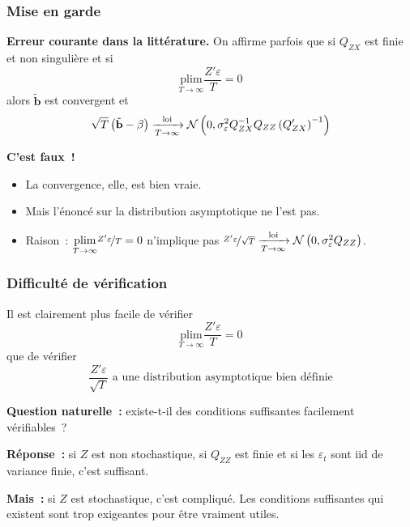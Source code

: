 \documentclass[10pt]{beamer}
\begin{document}
\begin{frame}
  \frametitle{Mise en garde}

  \textbf{Erreur courante dans la littérature.} On affirme parfois que
  si $Q_{ZX}$ est finie et non singulière et si
  \[ \underset{T\rightarrow\infty}{\text{plim}} \frac{Z'\varepsilon}{T} = 0 \]
  alors $\tilde{\mathbf b}$ est convergent et
  \[ \sqrt{T}\left(\tilde{\mathbf b} - \beta\right) \xrightarrow[T\rightarrow\infty]{\text{loi}} \mathcal N\left(0,\sigma_{\varepsilon}^2 Q_{ZX}^{-1}Q_{ZZ}\left(Q_{ZX}'\right)^{-1}\right) \]

  \bigskip

  \textbf{C'est faux~!}

  \begin{itemize}
  \item La convergence, elle, est bien vraie.
  \item Mais l'énoncé sur la distribution asymptotique ne l'est pas.
  \item Raison~: $\underset{T\rightarrow\infty}{\text{plim}} \nicefrac{Z'\varepsilon}{T} = 0$
    n'implique pas
    $\nicefrac{Z'\varepsilon}{\sqrt{T}} \xrightarrow[T\rightarrow\infty]{\text{loi}} \mathcal N\left(0,\sigma_{\varepsilon}^2 Q_{ZZ}\right)$.
  \end{itemize}

\end{frame}


\begin{frame}
  \frametitle{Difficulté de vérification}

  Il est clairement plus facile de vérifier
  \[ \underset{T\rightarrow\infty}{\text{plim}} \frac{Z'\varepsilon}{T} = 0 \]
  que de vérifier
  \[ \frac{Z'\varepsilon}{\sqrt{T}} \text{ a une distribution asymptotique bien définie} \]

  \medskip

  \textbf{Question naturelle~:} existe-t-il des conditions suffisantes facilement
  vérifiables~?

  \medskip

  \textbf{Réponse~:} si $Z$ est non stochastique, si $Q_{ZZ}$ est finie et si
  les $\varepsilon_t$ sont iid de variance finie, c'est suffisant.

  \medskip

  \textbf{Mais~:} si $Z$ est stochastique, c'est compliqué. Les conditions
  suffisantes qui existent sont trop exigeantes pour être vraiment utiles.

\end{frame}
\end{document}
